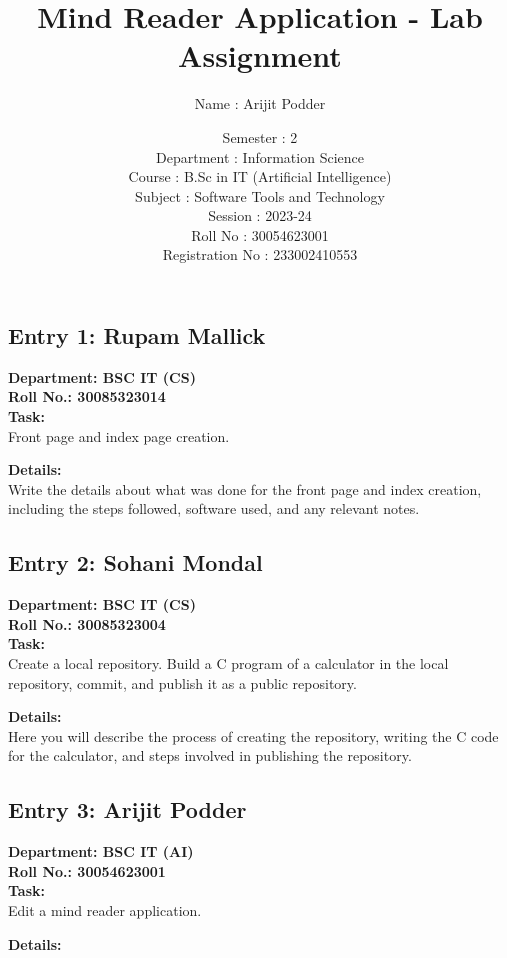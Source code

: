 \documentclass[a4paper,12pt]{article}
\begin{document}
\subsection{Entry 1: Rupam Mallick}
\textbf{Department: BSC IT (CS)} \\
\textbf{Roll No.: 30085323014} \\

\textbf{Task:} \\
Front page and index page creation.

\textbf{Details:} \\
Write the details about what was done for the front page and index creation, including the steps followed, software used, and any relevant notes.

\subsection{Entry 2: Sohani Mondal}
\textbf{Department: BSC IT (CS)} \\
\textbf{Roll No.: 30085323004} \\

\textbf{Task:} \\
Create a local repository. Build a C program of a calculator in the local repository, commit, and publish it as a public repository.

\textbf{Details:} \\
Here you will describe the process of creating the repository, writing the C code for the calculator, and steps involved in publishing the repository.

\subsection{Entry 3: Arijit Podder}
\textbf{Department: BSC IT (AI)} \\
\textbf{Roll No.: 30054623001} \\

\textbf{Task:} \\
Edit a mind reader application.

\textbf{Details:} \\

\title{Mind Reader Application - Lab Assignment}
\author{Name : Arijit Podder}
\date{Semester : 2\\
Department : Information Science \\
Course : B.Sc in IT (Artificial Intelligence) \\
Subject : Software Tools and Technology \\
Session : 2023-24 \\
Roll No : 30054623001 \\
Registration No : 233002410553}
\end{document}
